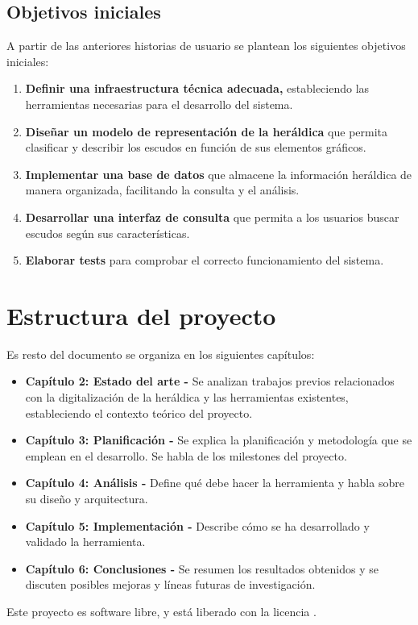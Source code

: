 \subsection{Objetivos iniciales}
A partir de las anteriores historias de usuario se plantean los siguientes objetivos
iniciales:

\begin{enumerate}
    \item \textbf{Definir una infraestructura técnica adecuada,} estableciendo las herramientas
    necesarias para el desarrollo del sistema.
    \item \textbf{Diseñar un modelo de representación de la heráldica} que permita clasificar y 
    describir los escudos en función de sus elementos gráficos.
    \item \textbf{Implementar una base de datos} que almacene la información heráldica de manera
    organizada, facilitando la consulta y el análisis.
    \item \textbf{Desarrollar una interfaz de consulta} que permita a los usuarios buscar escudos
    según sus características.
    \item \textbf{Elaborar tests} para comprobar el correcto funcionamiento del sistema.
\end{enumerate}

\section{Estructura del proyecto}
Es resto del documento se organiza en los siguientes capítulos:

\begin{itemize}
    \item \textbf{Capítulo 2: Estado del arte -} Se analizan trabajos previos relacionados
    con la digitalización de la heráldica y las herramientas existentes, estableciendo
    el contexto teórico del proyecto.
    \item \textbf{Capítulo 3: Planificación - } Se explica la planificación y metodología
    que se emplean en el desarrollo. Se habla de los milestones del proyecto.
    \item \textbf{Capítulo 4: Análisis - } Define qué debe hacer la herramienta y habla
    sobre su diseño y arquitectura.
    \item \textbf{Capítulo 5: Implementación - }Describe cómo se ha desarrollado y validado
    la herramienta. 
    \item \textbf{Capítulo 6: Conclusiones - } Se resumen los resultados obtenidos y se
    discuten posibles mejoras y líneas futuras de investigación.
\end{itemize}

Este proyecto es software libre, y está liberado con la licencia \cite{gplv3}.